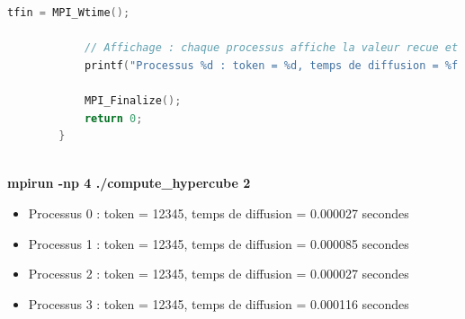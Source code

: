 \documentclass[a4paper,13pt]{book}
\begin{document}
\begin{lstlisting}[language=C, caption=Code source de \texttt{hypercube.c}]
            tfin = MPI_Wtime();
        
            // Affichage : chaque processus affiche la valeur recue et le temps de diffusion.
            printf("Processus %d : token = %d, temps de diffusion = %f secondes\n", rank, token, tfin - tdeb);
        
            MPI_Finalize();
            return 0;
        }
        
\end{lstlisting}
\textbf{mpirun -np 4 ./compute\_hypercube 2}
\begin{itemize}
\item Processus 0 : token = 12345, temps de diffusion = 0.000027 secondes
\item Processus 1 : token = 12345, temps de diffusion = 0.000085 secondes
\item Processus 2 : token = 12345, temps de diffusion = 0.000027 secondes
\item Processus 3 : token = 12345, temps de diffusion = 0.000116 secondes
\end{itemize}
\end{document}
